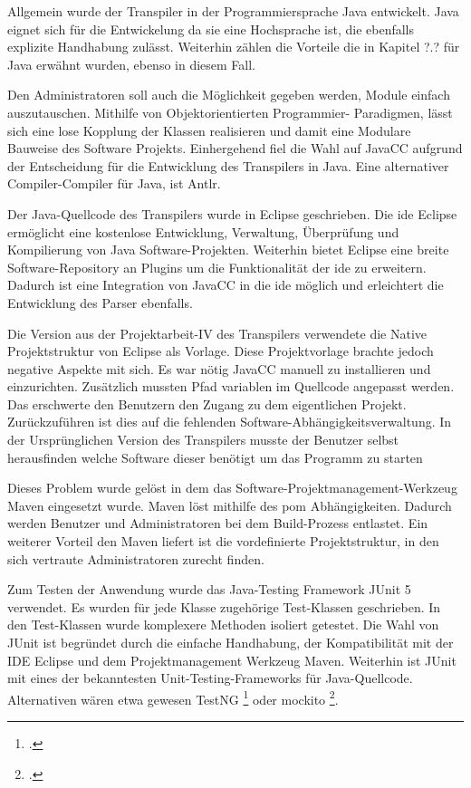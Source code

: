 Allgemein wurde der Transpiler in der Programmiersprache Java entwickelt. 
Java eignet sich für die Entwickelung da sie eine Hochsprache ist, die ebenfalls explizite Handhabung zulässt. 
Weiterhin zählen die Vorteile die in Kapitel ?.? für Java erwähnt wurden, ebenso in diesem Fall.

Den Administratoren soll auch die Möglichkeit gegeben werden, Module einfach auszutauschen. Mithilfe von Objektorientierten Programmier- Paradigmen, lässt sich eine lose Kopplung der Klassen realisieren und damit eine Modulare Bauweise des Software Projekts.
Einhergehend fiel die Wahl auf JavaCC aufgrund der Entscheidung für die Entwicklung des Transpilers in Java. Eine alternativer Compiler-Compiler für Java, ist Antlr. 

Der Java-Quellcode des Transpilers wurde in Eclipse geschrieben. Die \ac{ide} Eclipse ermöglicht eine kostenlose Entwicklung, Verwaltung, Überprüfung und Kompilierung von Java Software-Projekten. Weiterhin bietet Eclipse eine breite Software-Repository an Plugins um die Funktionalität der  \ac{ide} zu erweitern. Dadurch ist eine Integration von JavaCC in die  \ac{ide} möglich und erleichtert die Entwicklung des Parser ebenfalls.

Die Version aus der Projektarbeit-IV des Transpilers verwendete die Native Projektstruktur von Eclipse als Vorlage. Diese Projektvorlage brachte jedoch negative Aspekte mit sich. Es war nötig JavaCC manuell zu installieren und einzurichten. Zusätzlich mussten Pfad variablen im Quellcode angepasst werden. 
Das erschwerte den Benutzern den Zugang zu dem eigentlichen Projekt.
Zurückzuführen ist dies auf die fehlenden Software-Abhängigkeitsverwaltung. In der Ursprünglichen Version des Transpilers musste der Benutzer selbst herausfinden welche Software dieser benötigt um das Programm zu starten

Dieses Problem wurde gelöst in dem das Software-Projektmanagement-Werkzeug Maven eingesetzt wurde. Maven löst mithilfe des \ac{pom} Abhängigkeiten. 
Dadurch werden Benutzer und Administratoren bei dem Build-Prozess entlastet.
Ein weiterer Vorteil den Maven liefert ist die vordefinierte Projektstruktur, in den sich vertraute Administratoren zurecht finden.

Zum Testen der Anwendung wurde das Java-Testing Framework JUnit 5 verwendet. Es wurden für jede Klasse zugehörige Test-Klassen geschrieben. In den Test-Klassen wurde komplexere Methoden isoliert getestet.
Die Wahl von JUnit ist begründet durch die einfache Handhabung, der Kompatibilität mit der IDE Eclipse und dem Projektmanagement Werkzeug Maven. Weiterhin ist JUnit mit eines der bekanntesten Unit-Testing-Frameworks für Java-Quellcode. Alternativen wären etwa gewesen TestNG \footcite[Vgl. ][]{testng} oder mockito \footcite[Vgl. ][]{mockito}.

